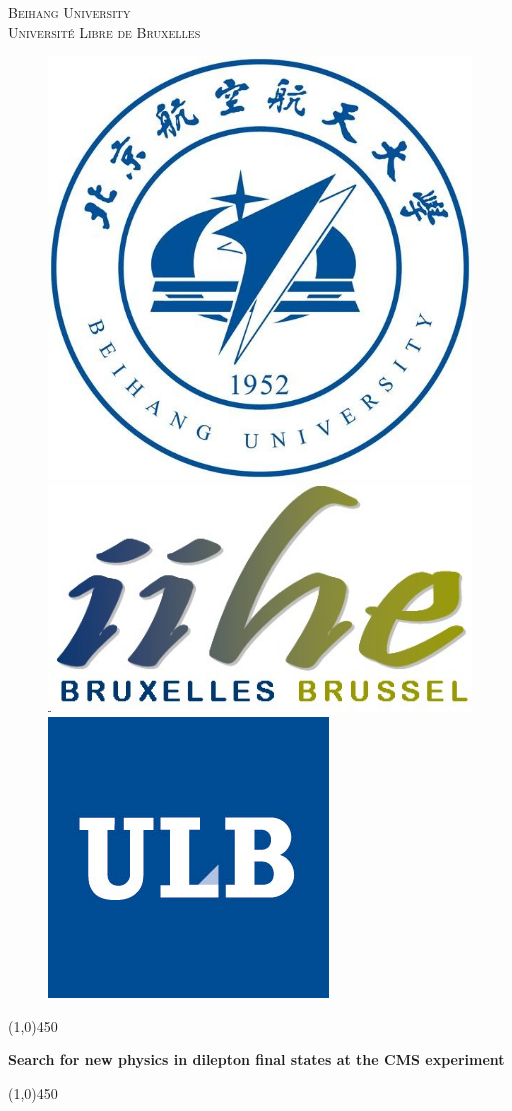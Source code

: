 \begin{titlepage}
    \begin{center}
        \begin{Large}
        \textsc{ Beihang University\\ Universit\'e Libre de Bruxelles}\\
        \vspace*{0.2cm}
        \end{Large}
        \vspace*{1cm}
        \begin{figure}
        \begin{center}
          \includegraphics[height=0.14\textwidth,valign=t]{figures/logo_buaa.jpg}
          \hspace{3cm}
          \includegraphics[height=0.14\textwidth,valign=t]{figures/logo_iihe.jpg}
          \hspace{3cm}
          \includegraphics[height=0.14\textwidth, valign=t]{figures/logonorm_ulb.jpg}
        \end{center}
        \end{figure}
        \vspace*{1cm}

        \line(1,0){450}
        \vspace*{0.4cm}
        \begin{huge}
        \textbf{Search for new physics in dilepton final states at the CMS experiment}
        \end{huge}
        \line(1,0){450}

        \vspace{1.5cm}
         \begin{Large}
        \vspace*{0.5cm}


\end{Large}
\end{center}
\end{titlepage}
